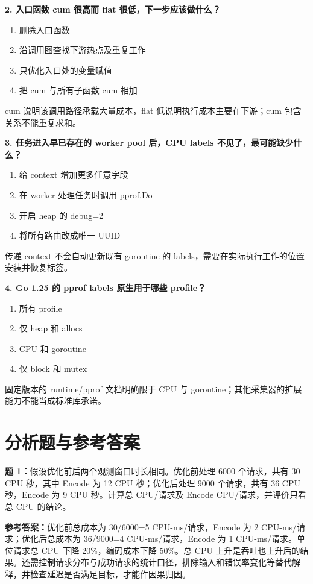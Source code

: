 \documentclass[UTF8,fontset=fandol,openany,11pt]{ctexbook}
\begin{document}
\noindent\textbf{2. 入口函数 cum 很高而 flat 很低，下一步应该做什么？}
\begin{enumerate}[label=\Alph*.]
\item 删除入口函数
\item 沿调用图查找下游热点及重复工作
\item 只优化入口处的变量赋值
\item 把 cum 与所有子函数 cum 相加
\end{enumerate}
cum 说明该调用路径承载大量成本，flat 低说明执行成本主要在下游；cum 包含关系不能重复求和。

\noindent\textbf{3. 任务进入早已存在的 worker pool 后，CPU labels 不见了，最可能缺少什么？}
\begin{enumerate}[label=\Alph*.]
\item 给 context 增加更多任意字段
\item 在 worker 处理任务时调用 pprof.Do
\item 开启 heap 的 debug=2
\item 将所有路由改成唯一 UUID
\end{enumerate}
传递 context 不会自动更新既有 goroutine 的 labels，需要在实际执行工作的位置安装并恢复标签。

\noindent\textbf{4. Go 1.25 的 pprof labels 原生用于哪些 profile？}
\begin{enumerate}[label=\Alph*.]
\item 所有 profile
\item 仅 heap 和 allocs
\item CPU 和 goroutine
\item 仅 block 和 mutex
\end{enumerate}
固定版本的 runtime/pprof 文档明确限于 CPU 与 goroutine；其他采集器的扩展能力不能当成标准库承诺。

\section{分析题与参考答案}
\noindent\textbf{题 1：}假设优化前后两个观测窗口时长相同。优化前处理 6000 个请求，共有 30 CPU 秒，其中 Encode 为 12 CPU 秒；优化后处理 9000 个请求，共有 36 CPU 秒，Encode 为 9 CPU 秒。计算总 CPU/请求及 Encode CPU/请求，并评价只看总 CPU 的结论。

\noindent\textbf{参考答案：}优化前总成本为 30/6000=5 CPU-ms/请求，Encode 为 2 CPU-ms/请求；优化后总成本为 36/9000=4 CPU-ms/请求，Encode 为 1 CPU-ms/请求。单位请求总 CPU 下降 20\%，编码成本下降 50\%。总 CPU 上升是吞吐也上升后的结果。还需控制请求分布与成功请求的统计口径，排除输入和错误率变化等替代解释，并检查延迟是否满足目标，才能作因果归因。
\end{document}
